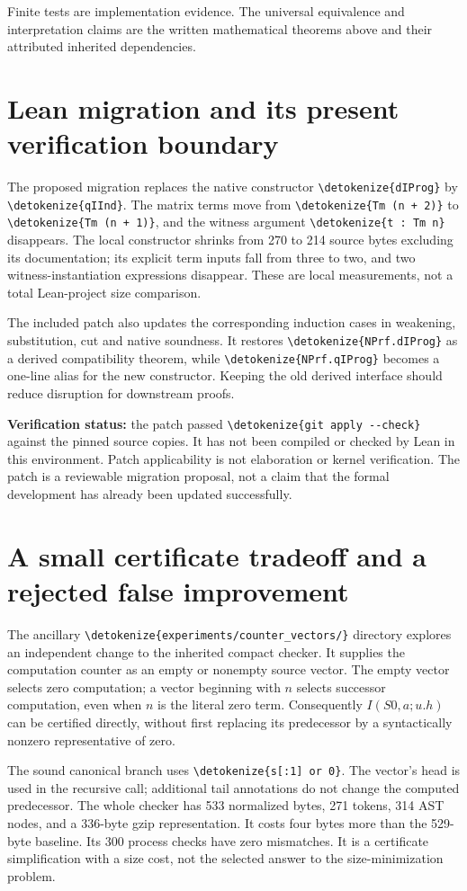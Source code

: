 \documentclass[11pt,letterpaper]{article}
\theoremstyle{definition}\newtheorem{definition}[theorem]{Definition}
\theoremstyle{remark}\newtheorem{remark}[theorem]{Remark}
\newcommand{\file}[1]{\expandafter\nolinkurl\expandafter{\detokenize{#1}}}
\begin{document}
Finite tests are implementation evidence. The universal equivalence and
interpretation claims are the written mathematical theorems above and
their attributed inherited dependencies.

\section{Lean migration and its present verification boundary}

The proposed migration replaces the native constructor
\file{dIProg} by \file{qIInd}. The matrix terms move from
\file{Tm (n + 2)} to \file{Tm (n + 1)}, and the witness argument
\file{t : Tm n} disappears. The local constructor shrinks from 270
to 214 source bytes excluding its documentation; its explicit term
inputs fall from three to two, and two witness-instantiation expressions
disappear. These are local measurements, not a total Lean-project size
comparison.

The included patch also updates the corresponding induction cases in
weakening, substitution, cut and native soundness. It restores
\file{NPrf.dIProg} as a derived compatibility theorem, while
\file{NPrf.qIProg} becomes a one-line alias for the new constructor.
Keeping the old derived interface should reduce disruption for downstream
proofs.

\textbf{Verification status:} the patch passed \file{git apply --check}
against the pinned source copies. It has not been compiled or checked by
Lean in this environment. Patch applicability is not elaboration or kernel
verification. The patch is a reviewable migration proposal, not a claim
that the formal development has already been updated successfully.

\section{A small certificate tradeoff and a rejected false improvement}

The ancillary \file{experiments/counter_vectors/} directory explores an
independent change to the inherited compact checker. It supplies the
computation counter as an empty or nonempty source vector. The empty
vector selects zero computation; a vector beginning with $n$ selects
successor computation, even when $n$ is the literal zero term.
Consequently $I(S0,a;u.h)$ can be certified directly, without first
replacing its predecessor by a syntactically nonzero representative of zero.

The sound canonical branch uses \file{s[:1] or 0}. The vector's head is
used in the recursive call; additional tail annotations do not change
the computed predecessor. The whole checker has 533 normalized bytes,
271 tokens, 314 AST nodes, and a 336-byte gzip representation. It costs
four bytes more than the 529-byte baseline. Its 300 process checks have
zero mismatches. It is a certificate simplification with a size cost,
not the selected answer to the size-minimization problem.
\end{document}
